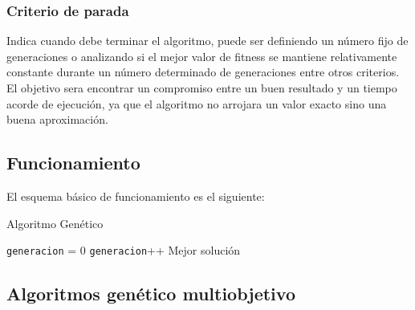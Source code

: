 \subsubsection{Criterio de parada} 
Indica cuando debe terminar el algoritmo, puede ser definiendo un número fijo de generaciones o analizando si el mejor valor de fitness se mantiene relativamente constante durante un número determinado de generaciones entre otros criterios. El objetivo sera encontrar un compromiso entre un buen resultado y un tiempo acorde de ejecución, ya que el algoritmo no arrojara un valor exacto sino una buena aproximación. 

\subsection{Funcionamiento}

El esquema básico de funcionamiento es el siguiente:


\begin{algorithm}%
	\caption{Algoritmo Genético}
	\label{alg:algoritmo_genetico_simple}
	\begin{algorithmic} [1] 
		{
			\STATE \texttt{generacion} = 0
			\STATE \texttt{generacion}++
			\ENDWHILE
			\RETURN Mejor solución
		}
	\end{algorithmic}
\end{algorithm}



%
%


\subsection{Algoritmos genético multiobjetivo}


